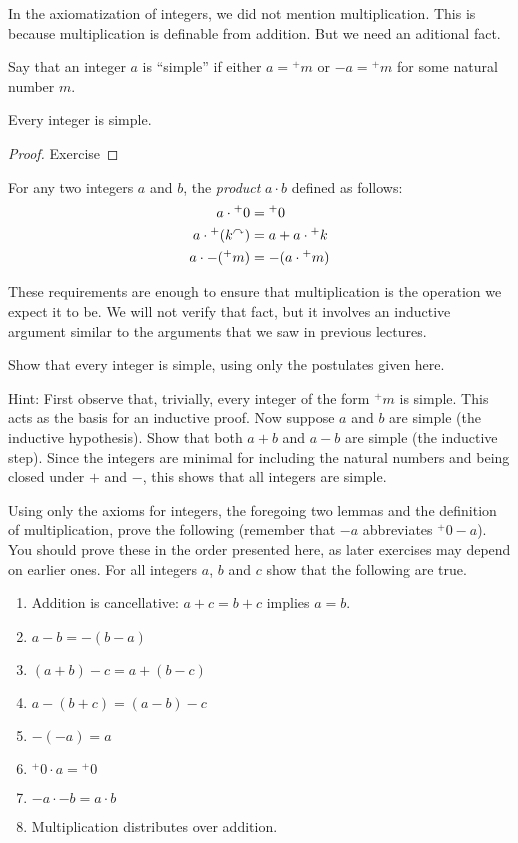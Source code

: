 In the axiomatization of integers, we did not mention multiplication. This is because multiplication is definable from addition. But we need an aditional fact.

Say that an integer $a$ is ``simple'' if either $a={}^+m$ or $-a = {}^+m$ for some natural number $m$. 

\begin{lem}
	Every integer is simple.
	
	\begin{proof}
		Exercise
	\end{proof}
\end{lem}

\begin{defn}
For any two integers $a$ and $b$, the \emph{product} $a\cdot b$ defined as follows:
\begin{align*}
	a\cdot {}^+0 &= {}^+0\\
	a\cdot {}^+(k^\curvearrowright) &= a + a\cdot {}^+k\\
	a\cdot -({}^+m) &= -(a\cdot {}^+m)
\end{align*}
\end{defn}

These requirements are enough to ensure that multiplication is the operation we expect it to be.
We will not verify that fact, but it involves an inductive argument similar to the arguments that we saw in previous lectures.

\begin{exer}
	\begin{exercise}
\item Show that every integer is simple, using only the postulates given here.

Hint: First observe that, trivially, every integer of the form ${}^+m$ is simple.
This acts as the basis for an inductive proof. 
Now suppose $a$ and $b$ are simple (the inductive hypothesis).
Show that both $a+b$ and $a-b$ are simple (the inductive step).
Since the integers are minimal for including the natural numbers and being closed under $+$ and $-$, this shows that all integers are simple.
\item Using only the axioms for integers, the foregoing two lemmas and the definition of multiplication, prove the following (remember
that $-a$ abbreviates ${}^+0 - a$). 
You should prove these in the order presented here, as later exercises may depend on earlier ones. For all integers $a$, $b$ and $c$ show that the following are true.
\begin{enumerate}
\item Addition is cancellative: $a + c = b + c$ implies $a = b$.
\item $a-b = -(b-a)$
\item $(a+b) - c = a + (b-c)$
\item $a-(b+c) = (a-b)-c$
\item $-(-a) = a$
\item ${}^+0\cdot a = {}^+0$
\item $-a\cdot -b = a\cdot b$
\item Multiplication distributes over addition.
\end{enumerate}
\end{exercise}
\end{exer}


